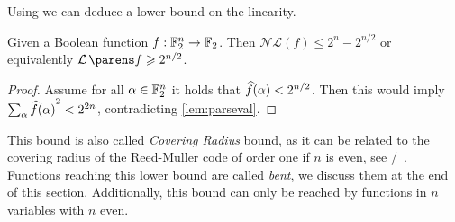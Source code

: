 Using  we can deduce a lower bound on the linearity.
\begin{proposition}
    Given a Boolean function $f : \mathbb{F}_2^n \to \mathbb{F}_2$.
    Then $\mathcal{N}\!\!\mathcal{L}(f) \leqslant 2^n - 2^{n/2}$ or equivalently $\linearity{f} \geqslant 2^{n/2}$.
\end{proposition}
\begin{proof}
    Assume for all $\alpha \in \mathbb{F}_2^n$ it holds that $\widehat{f}(\alpha) < 2^{n/2}$.
    Then this would imply $\sum_{\alpha} {\widehat{f}(\alpha)}^2 < 2^{2n}$, contradicting \cref{lem:parseval}.
\end{proof}
This bound is also called \emph{Covering Radius} bound, as it can be related to the covering radius of the Reed-Muller code of order one if $n$ is even, see \eg/~\cite[297]{BMM:Carlet10a}.
Functions reaching this lower bound are called \emph{bent}, we discuss them at the end of this section.
Additionally, this bound can only be reached by functions in $n$ variables with $n$ even.

